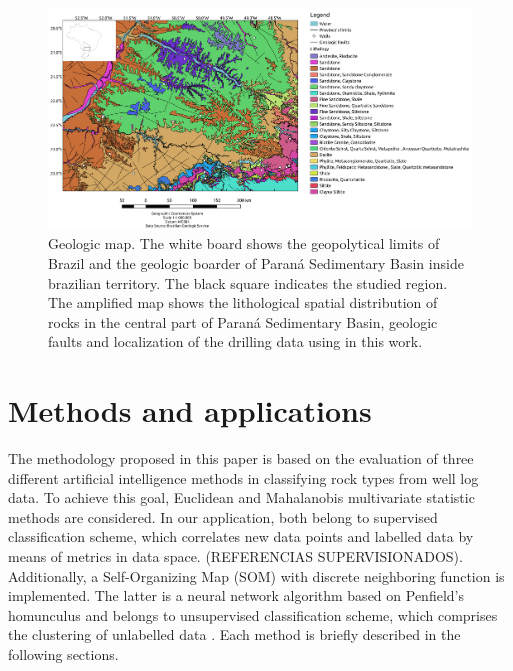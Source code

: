 \documentclass[preprint,12pt]{elsarticle}
\begin{document}
\begin{figure}[!htb]
\centering
\includegraphics[scale=0.4]{imagens/geologicwells.png}
\caption{Geologic map.  The white board shows the geopolytical limits of Brazil and the geologic boarder of Paran\'a Sedimentary Basin inside brazilian territory. The black square indicates the studied region. The amplified map shows the lithological spatial distribution of rocks in the central part of Paran\'a Sedimentary Basin, geologic faults and localization of the drilling data using in this work.}
\label{fig:Geomap}
\end{figure}


\section{Methods and applications}
\label{sec:MetAp}
The methodology proposed in this paper is based on the evaluation of three different artificial intelligence methods in classifying rock types from well log data. To achieve this goal, Euclidean and Mahalanobis multivariate statistic methods are considered. In our application, both belong to supervised classification scheme, which correlates new data points and labelled data by means of metrics in data space. (REFERENCIAS SUPERVISIONADOS). Additionally, a Self-Organizing Map (SOM) with discrete neighboring function is implemented. The latter is a neural network algorithm based on Penfield's homunculus \citep{ritter1989,Haykin2001,kohonen2013} and belongs to unsupervised classification scheme, which comprises the clustering of unlabelled data \citep{fankhauser2005, nabney2003, weinberger2009,chatpatanasiri2010,Deza2016}. Each method is briefly described in the following sections.      
\end{document}
